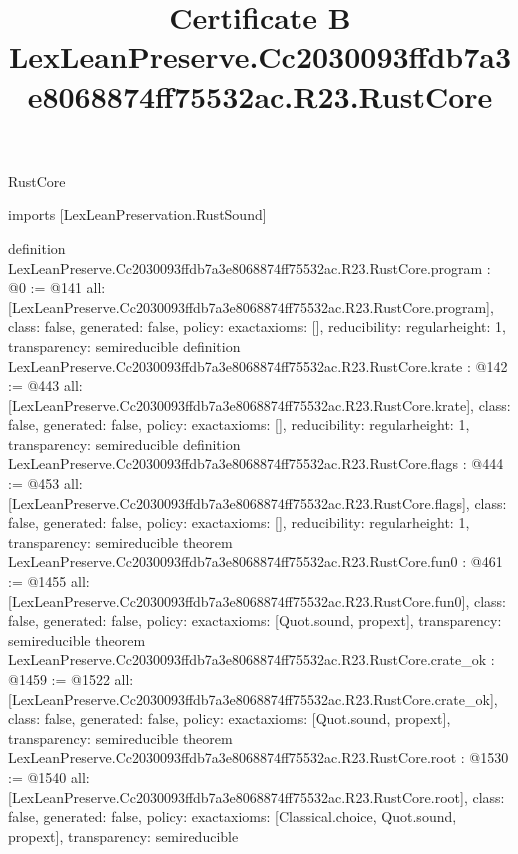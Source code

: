 \begin{lexlean}{RustCore}
\title{Certificate B LexLeanPreserve.Cc2030093ffdb7a3e8068874ff75532ac.R23.RustCore}
\begin{coremodule}
imports [LexLeanPreservation.RustSound]

definition LexLeanPreserve.Cc2030093ffdb7a3e8068874ff75532ac.R23.RustCore.program : @0 := @141 {
  all: [LexLeanPreserve.Cc2030093ffdb7a3e8068874ff75532ac.R23.RustCore.program],
  class: false,
  generated: false,
  policy: exact{axioms: []},
  reducibility: regular{height: 1},
  transparency: semireducible
}
definition LexLeanPreserve.Cc2030093ffdb7a3e8068874ff75532ac.R23.RustCore.krate : @142 := @443 {
  all: [LexLeanPreserve.Cc2030093ffdb7a3e8068874ff75532ac.R23.RustCore.krate],
  class: false,
  generated: false,
  policy: exact{axioms: []},
  reducibility: regular{height: 1},
  transparency: semireducible
}
definition LexLeanPreserve.Cc2030093ffdb7a3e8068874ff75532ac.R23.RustCore.flags : @444 := @453 {
  all: [LexLeanPreserve.Cc2030093ffdb7a3e8068874ff75532ac.R23.RustCore.flags],
  class: false,
  generated: false,
  policy: exact{axioms: []},
  reducibility: regular{height: 1},
  transparency: semireducible
}
theorem LexLeanPreserve.Cc2030093ffdb7a3e8068874ff75532ac.R23.RustCore.fun0 : @461 := @1455 {
  all: [LexLeanPreserve.Cc2030093ffdb7a3e8068874ff75532ac.R23.RustCore.fun0],
  class: false,
  generated: false,
  policy: exact{axioms: [Quot.sound, propext]},
  transparency: semireducible
}
theorem LexLeanPreserve.Cc2030093ffdb7a3e8068874ff75532ac.R23.RustCore.crate_ok : @1459 := @1522 {
  all: [LexLeanPreserve.Cc2030093ffdb7a3e8068874ff75532ac.R23.RustCore.crate_ok],
  class: false,
  generated: false,
  policy: exact{axioms: [Quot.sound, propext]},
  transparency: semireducible
}
theorem LexLeanPreserve.Cc2030093ffdb7a3e8068874ff75532ac.R23.RustCore.root : @1530 := @1540 {
  all: [LexLeanPreserve.Cc2030093ffdb7a3e8068874ff75532ac.R23.RustCore.root],
  class: false,
  generated: false,
  policy: exact{axioms: [Classical.choice, Quot.sound, propext]},
  transparency: semireducible
}


\end{coremodule}
\end{lexlean}
